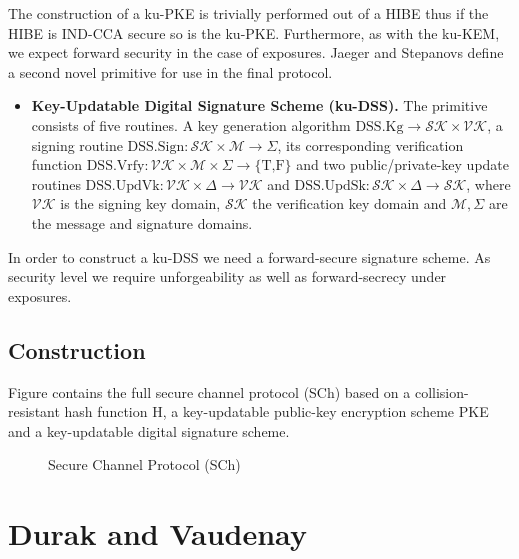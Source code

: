 \documentclass[11pt,a4paper,twoside,openright,bibliography=totoc]{scrbook}
\renewcommand{\t}{\text} %
\begin{document}
The construction of a ku-PKE is trivially performed out of a HIBE thus if
the HIBE is IND-CCA secure so is the ku-PKE. Furthermore, as with the
ku-KEM, we expect forward security in the case of exposures.
Jaeger and Stepanovs define a second novel primitive for use in the final protocol.
\begin{itemize}
\item \textbf{Key-Updatable Digital Signature Scheme (ku-DSS).} The primitive
  consists of five routines. A key generation algorithm
  $\t{DSS.Kg} \rightarrow \mathcal{SK} \times \mathcal{VK}$, a signing routine
  $\t{DSS.Sign}: \mathcal{SK} \times \mathcal{M} \rightarrow \Sigma$, its
  corresponding verification function
  $\t{DSS.Vrfy}: \mathcal{VK} \times \mathcal{M} \times \Sigma \rightarrow \{\t{T,F}\}$ and
  two public/private-key update routines
  $\t{DSS.UpdVk}: \mathcal{VK} \times \Delta \rightarrow \mathcal{VK}$ and
  $\t{DSS.UpdSk}: \mathcal{SK} \times \Delta \rightarrow \mathcal{SK}$, where
  $\mathcal{VK}$ is the signing key domain, $\mathcal{SK}$ the verification key
  domain and $\mathcal{M}, \Sigma$ are the message and signature domains.
\end{itemize}

In order to construct a ku-DSS we need a forward-secure signature scheme. As
security level we require unforgeability as well as forward-secrecy under
exposures. 

\subsection{Construction}
\label{sec:construction-1}

Figure contains the full secure channel protocol (SCh) based on a collision-resistant
hash function H, a key-updatable public-key encryption scheme PKE and
a key-updatable digital signature scheme.


\begin{figure}[ht]
  \centering
  \setlength{\fboxsep}{10pt}
  \scalebox{0.9}{%
    \fbox{%
      
    }
  }
  \caption{Secure Channel Protocol (SCh)}
  \label{fig:secure-channel}
\end{figure}

\section[Durak and Vaudenay]
{Durak and Vaudenay~\cite{durak2018bidirectional}}
\label{sec:durak-vaudenay}
\end{document}

